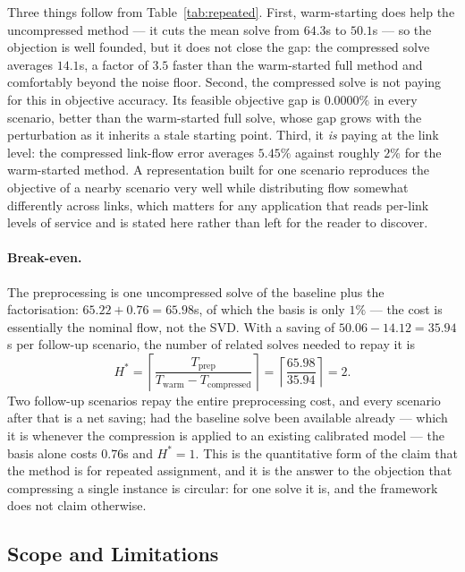 \documentclass[11pt]{article}
\begin{document}
Three things follow from Table~\ref{tab:repeated}. First, warm-starting does help the
uncompressed method --- it cuts the mean solve from $64.3$s to $50.1$s --- so the objection is
well founded, but it does not close the gap: the compressed solve averages $14.1$s, a factor of
$3.5$ faster than the warm-started full method and comfortably beyond the noise floor. Second,
the compressed solve is not paying for this in objective accuracy. Its feasible objective gap
is $0.0000\%$ in every scenario, better than the warm-started full solve, whose gap grows with
the perturbation as it inherits a stale starting point. Third, it \emph{is} paying at the link
level: the compressed link-flow error averages $5.45\%$ against roughly $2\%$ for the
warm-started method. A representation built for one scenario reproduces the objective of a
nearby scenario very well while distributing flow somewhat differently across links, which
matters for any application that reads per-link levels of service and is stated here rather
than left for the reader to discover.

\paragraph{Break-even.} The preprocessing is one uncompressed solve of the baseline plus the
factorisation: $65.22 + 0.76 = 65.98$s, of which the basis is only $1\%$ --- the cost is
essentially the nominal flow, not the SVD. With a saving of $50.06 - 14.12 = 35.94$s per
follow-up scenario, the number of related solves needed to repay it is
\begin{equation}
\label{eq:breakeven}
H^\ast=\left\lceil\frac{T_{\text{prep}}}{T_{\text{warm}}-T_{\text{compressed}}}\right\rceil
=\left\lceil\frac{65.98}{35.94}\right\rceil=2 .
\end{equation}
Two follow-up scenarios repay the entire preprocessing cost, and every scenario after that is
a net saving; had the baseline solve been available already --- which it is whenever the
compression is applied to an existing calibrated model --- the basis alone costs $0.76$s and
$H^\ast=1$. This is the quantitative form of the claim that the method is for repeated
assignment, and it is the answer to the objection that compressing a single instance is
circular: for one solve it is, and the framework does not claim otherwise.

\subsection{Scope and Limitations}
\label{sec:scope-limits}
\end{document}

